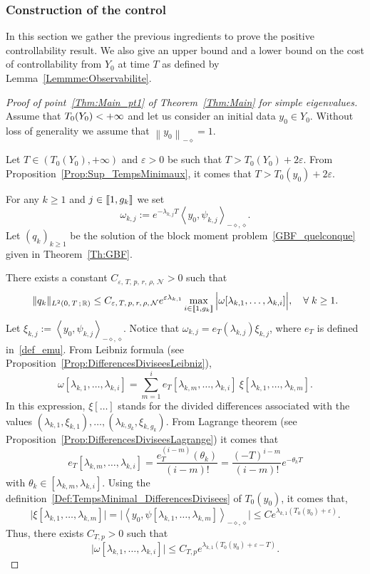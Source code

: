 \documentclass[AHL,Unicode,longabstracts]{cedram}
\newcommand{\llbracket}{\mathopen{[\mkern -2.7mu[}}
\newcommand{\rrbracket}{\mathclose{]\mkern -2.7mu]}}
\newcommand{\inter}[2]{\llbracket #1,#2 \rrbracket}
\newcommand{\Fzp}{Y_0}
\newcommand{\normeXmalpha}[1]{\left\| #1 \right\|_{-\diamond}}
\newcommand{\dual}[2]{\left\langle #1, #2 \right\rangle_{-\diamond,\diamond}}
\newcommand{\n}{g}
\newcommand{\NN}{\mathcal{N}}
\newcommand{\R}{\mathbb{R}}
\let\oldforall\forall
\renewcommand*{\forall}{\mathrel{\oldforall}}
\begin{document}
\subsubsection{Construction of the control} \label{Subsec:ConstructionControle}
In this section we gather the previous ingredients to prove the positive controllability result. We also give an upper bound and a lower bound on the cost of controllability from $\Fzp$ at time $T$ as defined by Lemma~\ref{Lemmme:Observabilite}.
\begin{proof}[Proof of point~\eqref{Thm:Main_pt1} of Theorem~\ref{Thm:Main} for simple eigenvalues]
Assume that $T_0(\Fzp)\linebreak <+\infty$ and let us consider an initial data $y_0\in \Fzp$. Without loss of generality we assume that $\normeXmalpha{y_0}=1$.

Let $T\in (T_0(\Fzp), +\infty)$ and $\varepsilon >0$ be such that $T> T_0(\Fzp) + 2\varepsilon$. From Proposition~\ref{Prop:Sup_TempsMinimaux}, it comes that $T> T_0(y_0) + 2\varepsilon$.

For any $k \geq 1$ and $j \in \inter{1}{\n_k}$ we set
\[
\omega_{k,j} := e^{-\lambda_{k,j} T} \dual{y_0}{\psi_{k,j}}.
\]
Let $(q_k)_{k \geq 1}$ be the solution of the block moment problem~\eqref{GBF_quelconque} given in Theorem~\ref{Th:GBF}.

There exists a constant $C_{\varepsilon,\,T,\, p,\, r,\, \rho,\, \NN} >0$ such that
\[
\| q_k \|_{L^2(0,\,T\,;\,\R)} \leq C_{\varepsilon,\,T,\,p,\,r,\,\rho,\,\NN} e^{\varepsilon \lambda_{k,1} }
\max \limits_{i\in \inter{1}{\n_k}} \Big| \omega[\lambda_{k,1}, \dots, \lambda_{k,i}] \Big|, \quad \forall k \geq 1.
\]
Let $\xi_{k,j} := \dual{y_0}{\psi_{k,j}}$. Notice that $\omega_{k,j} = e_T(\lambda_{k,j}) \xi_{k,j}$, where $e_T$ is defined in~\eqref{def_emu}. From Leibniz formula (see Proposition~\ref{Prop:DifferencesDiviseesLeibniz}),
\begin{equation}\label{GBF_Leibniz_omega}
\omega[\lambda_{k,1},\dots,\lambda_{k,i}] = \sum_{m=1}^i e_T[\lambda_{k,m},\dots,\lambda_{k,i}] \: \xi[\lambda_{k,1}, \dots, \lambda_{k,m}].
\end{equation}
In this expression, $\xi[\dots]$ stands for the divided differences associated with the values $(\lambda_{k,1}, \xi_{k,1}), \dots,(\lambda_{k,\n_k},\xi_{k,\n_k})$. From Lagrange theorem (see Proposition~\ref{Prop:DifferencesDiviseesLagrange}) it comes that
\[
e_T[\lambda_{k,m},\dots,\lambda_{k,i}] = \frac{e_T^{(i-m)}(\theta_k)}{(i-m)!} = \frac{(-T)^{i-m}}{(i-m)!} e^{-\theta_k T}
\]
with $\theta_k \in [\lambda_{k,m}, \lambda_{k,i}]$. Using the definition~\eqref{Def:TempsMinimal_DifferencesDivisees} of $T_0(y_0)$, it comes that,
\begin{equation}\label{GBF_Estimee_Xi_kj}
\big| \xi[\lambda_{k,1}, \dots, \lambda_{k,m}] \big| = \big| \dual{y_0}{\psi[\lambda_{k,1}, \dots, \lambda_{k,m}]} \big| \leq C e^{\lambda_{k,1} (T_0(y_0) + \varepsilon)}.
\end{equation}
Thus, there exists $C_{T, p} >0$ such that
\[
\big| \omega[\lambda_{k,1}, \dots, \lambda_{k,i}] \big| \leq C_{T,p} e^{\lambda_{k,1} (T_0(y_0) +\varepsilon - T)}.
\]


\end{proof}
\end{document}
